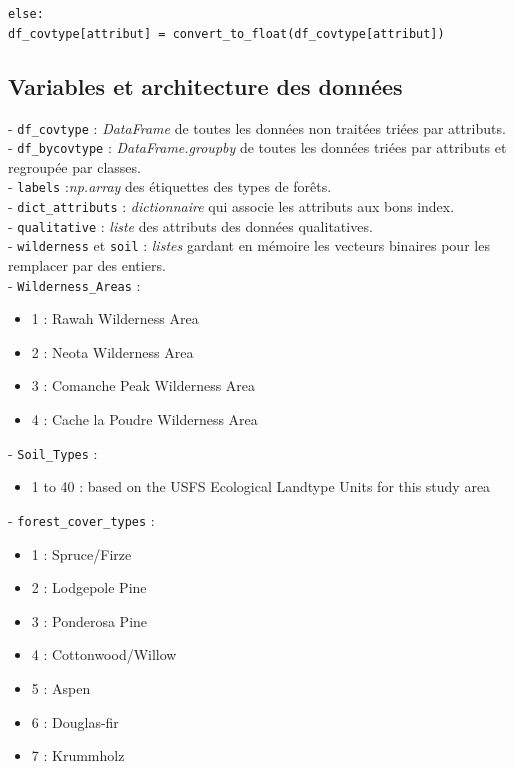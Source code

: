 \documentclass[12pt,a4paper]{article}
\numberwithin{equation}{section}
\begin{document}
	\quad \quad \verb!else:!\\
	\quad \quad \quad \verb!df_covtype[attribut] = convert_to_float(df_covtype[attribut])!\\

	
	\subsection{Variables et architecture des données}
	
	 	- \verb!df_covtype! : \textit{DataFrame} de toutes les données non traitées triées par attributs. \\
	 	- \verb!df_bycovtype! : \textit{DataFrame.groupby} de toutes les données triées par attributs et regroupée par classes. \\
	 	- \verb!labels! :\textit{np.array} des étiquettes des types de forêts.\\
	 	- \verb!dict_attributs! : \textit{dictionnaire} qui associe les attributs aux bons index. \\
	 	- \verb!qualitative! : \textit{liste} des attributs des données qualitatives.\\
	 	- \verb!wilderness! et \verb!soil! : \textit{listes} gardant en mémoire les vecteurs binaires pour les remplacer par des entiers.\\
	 	
		 	- \verb!Wilderness_Areas! :
		 	\begin{itemize}
		 		\item 1 : Rawah Wilderness Area
		 		\item 2 : Neota Wilderness Area
		 		\item 3 : Comanche Peak Wilderness Area
		 		\item 4 : Cache la Poudre Wilderness Area
		 	\end{itemize}
		 	
		 	- \verb!Soil_Types! :
		 	\begin{itemize}
		 		\item 1 to 40 : based on the USFS Ecological Landtype Units for this study area
		 	\end{itemize}
	 	
	 	- \verb!forest_cover_types! : 
	 	\begin{itemize}
	 		\item 1 : Spruce/Firze
 			\item 2 : Lodgepole Pine
 			\item 3 : Ponderosa Pine
 			\item 4 : Cottonwood/Willow
 			\item 5 : Aspen
 			\item 6 : Douglas-fir
 			\item 7 : Krummholz
		\end{itemize}
	
\end{document}
